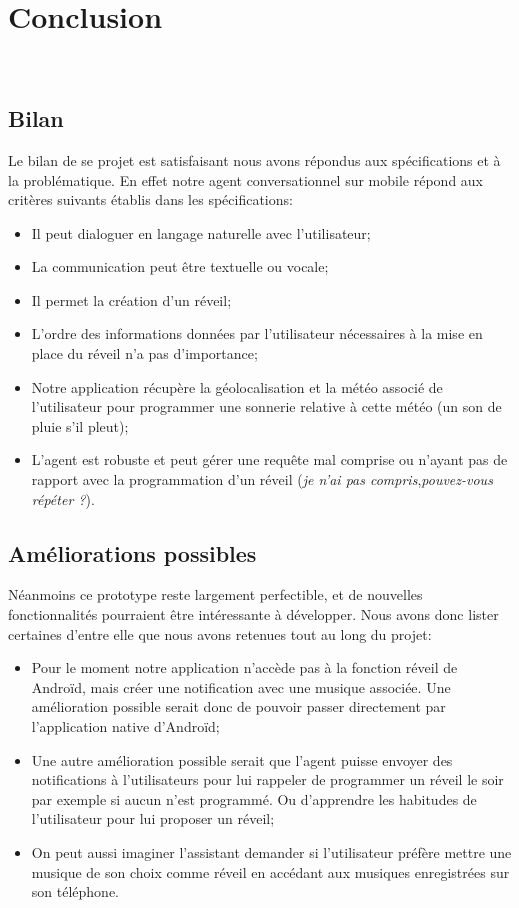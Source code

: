 \chapter*{Conclusion}
\thispagestyle{plain}
~\\[1cm]
{ \large

\section{Bilan}
Le bilan de se projet est satisfaisant nous avons répondus aux spécifications et à la problématique. En effet notre agent conversationnel sur mobile répond aux critères suivants établis dans les spécifications:
\begin{itemize}
	\item Il peut dialoguer en langage naturelle avec l'utilisateur;
	\item La communication peut être textuelle ou vocale;
	\item Il permet la création d'un réveil;
	\item L'ordre des informations données par l'utilisateur nécessaires à la mise en place du réveil n'a pas d'importance;
	\item Notre application récupère la géolocalisation et la météo associé de l'utilisateur pour programmer une sonnerie relative à cette météo (un son de pluie s'il pleut);
	\item L'agent est robuste et peut gérer une requête mal comprise ou n'ayant pas de rapport avec la programmation d'un réveil (\og\emph{je n'ai pas compris}\fg,\og\emph{pouvez-vous répéter ?}\fg ).
\end{itemize}

\section{Améliorations possibles}
Néanmoins ce prototype reste largement perfectible, et de nouvelles fonctionnalités pourraient être intéressante à développer. Nous avons donc lister certaines d'entre elle que nous avons retenues tout au long du projet:
\begin{itemize}
	\item Pour le moment notre application n'accède pas à la fonction réveil de Androïd, mais créer une notification avec une musique associée. Une amélioration possible serait donc de pouvoir passer directement par l'application native d'Androïd;
	\item Une autre amélioration possible serait que l'agent puisse envoyer des notifications à l'utilisateurs pour lui rappeler de programmer un réveil le soir par exemple si aucun n'est programmé. Ou d'apprendre les habitudes de l'utilisateur pour lui proposer un réveil;
	\item On peut aussi imaginer l'assistant demander si l'utilisateur préfère mettre une musique de son choix comme réveil en accédant aux musiques enregistrées sur son téléphone.
\end{itemize}
}
